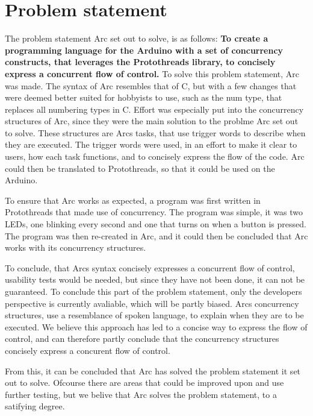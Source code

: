 \section{Problem statement}

The problem statement Arc set out to solve, is as follows: 
\textbf{To create a programming language for the Arduino with a set of concurrency constructs, that leverages the Protothreads library, to concisely express a concurrent flow of control.}
To solve this problem statement, Arc was made. The syntax of Arc resembles that of C, but with a few changes that were deemed better suited for hobbyists to use, such as the num type, that replaces all numbering types in C. Effort was especially put into the concurrency structures of Arc, since they were the main solution to the problme Arc set out to solve. These structures are Arcs tasks, that use trigger words to describe when they are executed. The trigger words were used, in an effort to make it clear to users, how each task functions, and to concisely express the flow of the code. Arc could then be translated to Protothreads, so that it could be used on the Arduino.

To ensure that Arc works as expected, a program was first written in Protothreads that made use of concurrency. The program was simple, it was two LEDs, one blinking every second and one that turns on when a button is pressed. The program was then re-created in Arc, and it could then be concluded that Arc works with its concurrency structures. 

To conclude, that Arcs syntax concisely expresses a concurrent flow of control, usability tests would be needed, but since they have not been done, it can not be guaranteed. To conclude this part of the problem statement, only the developers perspective is currently avaliable, which will be partly biased. Arcs concurrency structures, use a resemblance of spoken language, to explain when they are to be executed. We believe this approach has led to a concise way to express the flow of control, and can therefore partly conclude that the concurrency structures concisely express a concurent flow of control. 

From this, it can be concluded that Arc has solved the problem statement it set out to solve. Ofcourse there are areas that could be improved upon and use further testing, but we belive that Arc solves the problem statement, to a satifying degree. 


